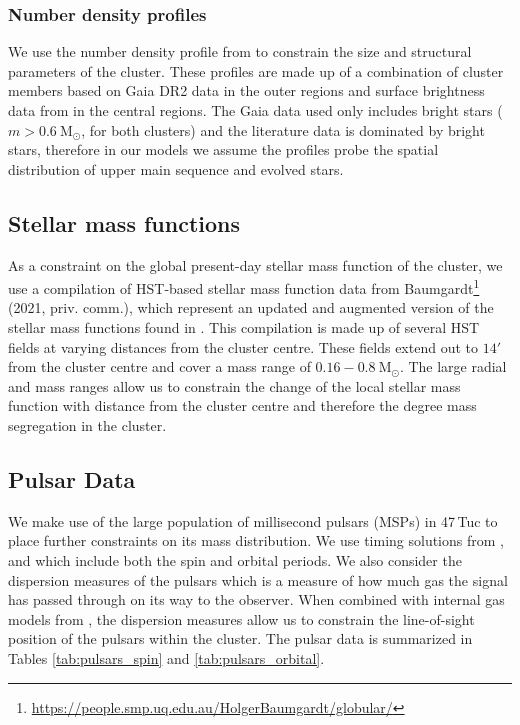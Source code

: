 \subsubsection{Number density profiles}
We use the number density profile from \citet{DeBoer2019} to constrain the size and structural
parameters of the cluster. These profiles are made up of a combination of cluster members based on
Gaia DR2 data in the outer regions and surface brightness data from \citet{Trager1995} in the
central regions. The Gaia data used only includes bright stars ($m > 0.6 \ \mathrm{M}_\odot$, for
both clusters) and the literature data is dominated by bright stars, therefore in our models we
assume the profiles probe the spatial distribution of upper main sequence and evolved stars.

\subsection{Stellar mass functions}

As a constraint on the global present-day stellar mass function of the cluster, we use a compilation
of HST-based stellar mass function data from
Baumgardt\footnote{\url{https://people.smp.uq.edu.au/HolgerBaumgardt/globular/}} (2021, priv.
comm.), which represent an updated and augmented version of the stellar mass functions found in
\citet{Sollima2017}. This compilation is made up of several HST fields at varying distances from the
cluster centre. These fields extend out to $14 '$ from the cluster centre and cover a mass range of
$0.16 - 0.8 \ \mathrm{M}_\odot$. The large radial and mass ranges allow us to constrain the change
of the local stellar mass function with distance from the cluster centre and therefore the degree
mass segregation in the cluster.

\subsection{Pulsar Data}

We make use of the large population of millisecond pulsars (MSPs) in 47\,Tuc to place further
constraints on its mass distribution. We use timing solutions from \citet{Freire2017},
\citet{Ridolfi2016} and \citet{Freire2018} which include both the spin and orbital periods. We also
consider the dispersion measures of the pulsars which is a measure of how much gas the signal has
passed through on its way to the observer. When combined with internal gas models from
\citet{Abbate2018}, the dispersion measures allow us to constrain the line-of-sight position of the
pulsars within the cluster. The pulsar data is summarized in Tables \ref{tab:pulsars_spin} and
\ref{tab:pulsars_orbital}.





